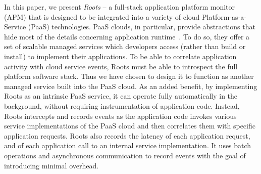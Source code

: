 In this paper, we present \textit{Roots} --  
a full-stack application platform 
monitor (APM) that is designed to be integrated
into a variety of cloud Platform-as-a-Service (PaaS) technologies. 
PaaS clouds, in particular, provide abstractions that hide most of the 
details concerning application
runtime~\cite{Soni:2014:CCB:2592737.2592741}. 
To do so, they offer a set of scalable managed services
which developers access (rather than build or install) 
to implement their applications.
To be able to correlate application activity with cloud service events,
Roots must be able to introspect the full platform software stack.  Thus we
have chosen to design it to function
as another managed service built into the PaaS cloud. 
As an added benefit, by implementing Roots as an intrinsic PaaS service,
it can operate fully automatically in the background, without
requiring instrumentation of application code. Instead,
Roots intercepts and records events as the
application code invokes various service implementations of the PaaS cloud
and then correlates them with specific application requests.
Roots also records the latency of each application request, and
of each application call to an
internal service implementation. It uses batch operations and asynchronous 
communication to record events with the goal of introducing minimal overhead.

